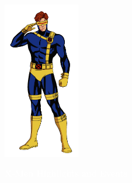 \documentclass[12pt]{article}
\begin{document}
\newpage
\thispagestyle{empty}

\hypertarget{xmen}{}

\begin{center}
    \vspace*{2cm}
    \includegraphics[width=0.25\textwidth]{cyclops.png}
    \vspace{0.5cm}

    {\Huge \textbf{\textcolor{white}{X-Men Highlights and Events}}}
\end{center}

\vspace{0.5cm}
\end{document}
